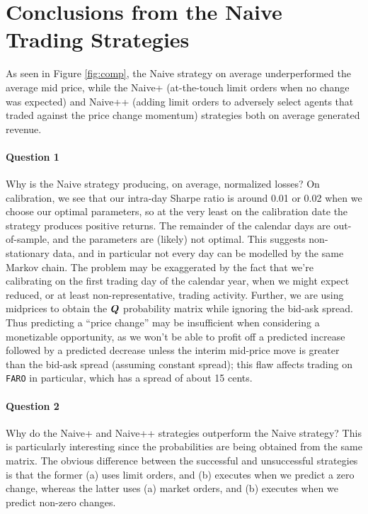 \section{Conclusions from the Naive Trading Strategies}

As seen in Figure \ref{fig:comp}, the Naive strategy on average underperformed the average mid price, while the Naive+ (at-the-touch limit orders when no change was expected) and Naive++ (adding limit orders to adversely select agents that traded against the price change momentum) strategies both on average generated revenue.

\paragraph{Question 1} Why is the Naive strategy producing, on average, normalized losses? On calibration, we see that our intra-day Sharpe ratio is around 0.01 or 0.02 when we choose our optimal parameters, so at the very least on the calibration date the strategy produces positive returns. The remainder of the calendar days are out-of-sample, and the parameters are (likely) not optimal. This suggests non-stationary data, and in particular not every day can be modelled by the same Markov chain. The problem may be exaggerated by the fact that we're calibrating on the first trading day of the calendar year, when we might expect reduced, or at least non-representative, trading activity. Further, we are using midprices to obtain the $\boldsymbol{Q}$ probability matrix while ignoring the bid-ask spread. Thus predicting a ``price change'' may be insufficient when considering a monetizable opportunity, as we won't be able to profit off a predicted increase followed by a predicted decrease unless the interim mid-price move is greater than the bid-ask spread (assuming constant spread); this flaw affects trading on \texttt{FARO} in particular, which has a spread of about 15 cents.

\paragraph{Question 2} Why do the Naive+ and Naive++ strategies outperform the Naive strategy? This is particularly interesting since the probabilities are being obtained from the same matrix. The obvious difference between the successful and unsuccessful strategies is that the former (a) uses limit orders, and (b) executes when we predict a zero change, whereas the latter uses (a) market orders, and (b) executes when we predict non-zero changes.

